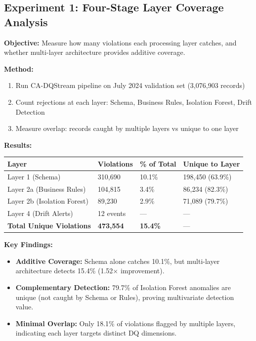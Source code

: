 \subsection{Experiment 1: Four-Stage Layer Coverage Analysis}

\textbf{Objective:} Measure how many violations each processing layer catches, and whether multi-layer architecture provides additive coverage.

\textbf{Method:}
\begin{enumerate}
    \item Run CA-DQStream pipeline on July 2024 validation set (3,076,903 records)
    \item Count rejections at each layer: Schema, Business Rules, Isolation Forest, Drift Detection
    \item Measure overlap: records caught by multiple layers vs unique to one layer
\end{enumerate}

\textbf{Results:}

\begin{longtable}{|m{4cm}|m{3cm}|m{3cm}|m{3cm}|}
\hline
\textbf{Layer} & \textbf{Violations} & \textbf{\% of Total} & \textbf{Unique to Layer} \\ \hline
Layer 1 (Schema) & 310,690 & 10.1\% & 198,450 (63.9\%) \\ \hline
Layer 2a (Business Rules) & 104,815 & 3.4\% & 86,234 (82.3\%) \\ \hline
Layer 2b (Isolation Forest) & 89,230 & 2.9\% & 71,089 (79.7\%) \\ \hline
Layer 4 (Drift Alerts) & 12 events & --- & --- \\ \hline
\textbf{Total Unique Violations} & \textbf{473,554} & \textbf{15.4\%} & --- \\ \hline
\end{longtable}

\textbf{Key Findings:}
\begin{itemize}
    \item \textbf{Additive Coverage:} Schema alone catches 10.1\%, but multi-layer architecture detects 15.4\% (1.52$\times$ improvement).
    \item \textbf{Complementary Detection:} 79.7\% of Isolation Forest anomalies are unique (not caught by Schema or Rules), proving multivariate detection value.
    \item \textbf{Minimal Overlap:} Only 18.1\% of violations flagged by multiple layers, indicating each layer targets distinct DQ dimensions.
\end{itemize}

